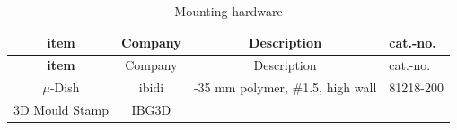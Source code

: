 \documentclass[11pt,singlespacinge,twoside]{reedthesis} %
\begin{document}
\begin{longtable}[]{@{}cccl@{}}
\caption{\label{tab:mounthard} Mounting hardware}\tabularnewline
\toprule
\begin{minipage}[b]{0.26\columnwidth}\centering
\textbf{item}\strut
\end{minipage} & \begin{minipage}[b]{0.10\columnwidth}\centering
Company\strut
\end{minipage} & \begin{minipage}[b]{0.42\columnwidth}\centering
Description\strut
\end{minipage} & \begin{minipage}[b]{0.11\columnwidth}\raggedright
cat.-no.\strut
\end{minipage}\tabularnewline
\midrule
\endfirsthead
\toprule
\begin{minipage}[b]{0.26\columnwidth}\centering
\textbf{item}\strut
\end{minipage} & \begin{minipage}[b]{0.10\columnwidth}\centering
Company\strut
\end{minipage} & \begin{minipage}[b]{0.42\columnwidth}\centering
Description\strut
\end{minipage} & \begin{minipage}[b]{0.11\columnwidth}\raggedright
cat.-no.\strut
\end{minipage}\tabularnewline
\midrule
\endhead
\begin{minipage}[t]{0.26\columnwidth}\centering
\(\mu\)-Dish\strut
\end{minipage} & \begin{minipage}[t]{0.10\columnwidth}\centering
ibidi\strut
\end{minipage} & \begin{minipage}[t]{0.42\columnwidth}\centering
20-35 mm polymer, \#1.5, high wall\strut
\end{minipage} & \begin{minipage}[t]{0.11\columnwidth}\raggedright
81218-200\strut
\end{minipage}\tabularnewline
\begin{minipage}[t]{0.26\columnwidth}\centering
3D Mould Stamp\strut
\end{minipage} & \begin{minipage}[t]{0.10\columnwidth}\centering
IBG3D\strut
\end{minipage} & \begin{minipage}[t]{0.42\columnwidth}\centering

\end{minipage}
\end{longtable}
\end{document}
